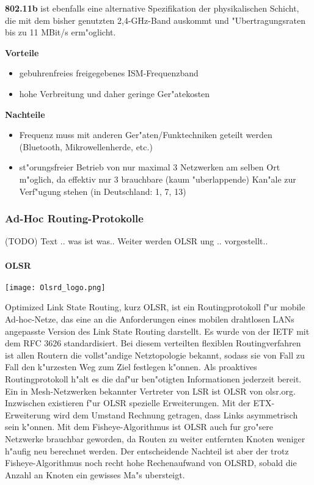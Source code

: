 \textbf{802.11b} ist ebenfalls eine alternative Spezifikation der physikalischen
Schicht, die mit dem bisher genutzten 2,4-GHz-Band auskommt und
"Ubertragungsraten bis zu 11 MBit/s erm"oglicht. 

\textbf{Vorteile}
\begin{itemize}	
	\item gebuhrenfreies freigegebenes ISM-Frequenzband 
	\item hohe Verbreitung und daher geringe Ger"atekosten 
\end{itemize}

\textbf{Nachteile}
\begin{itemize}	
	\item Frequenz muss mit anderen Ger"aten/Funktechniken geteilt werden
	(Bluetooth, Mikrowellenherde, etc.) 
	\item st"orungsfreier Betrieb von nur maximal 3 Netzwerken
	am selben Ort m"oglich, da effektiv nur 3 brauchbare
	(kaum "uberlappende) Kan"ale zur Verf"ugung stehen
	(in Deutschland: 1, 7, 13) 
\end{itemize}

\subsubsection{Ad-Hoc Routing-Protokolle}
(TODO) Text .. was ist was.. 
Weiter werden OLSR ung .. vorgestellt..

\paragraph{OLSR}

\texttt{[image: Olsrd\_logo.png]}

Optimized Link State Routing, kurz OLSR, ist ein Routingprotokoll
f"ur mobile Ad-hoc-Netze, das eine an die Anforderungen eines mobilen
drahtlosen LANs angepasste Version des Link State Routing darstellt. Es
wurde von der IETF mit dem RFC 3626 standardisiert. Bei diesem
verteilten flexiblen Routingverfahren ist allen Routern die vollst"andige
Netztopologie bekannt, sodass sie von Fall zu Fall den k"urzesten Weg zum
Ziel festlegen k"onnen. Als proaktives Routingprotokoll h"alt es die daf"ur
ben"otigten Informationen jederzeit bereit. Ein in Mesh-Netzwerken
bekannter Vertreter von LSR ist OLSR von olsr.org. Inzwischen existieren
f"ur OLSR spezielle Erweiterungen. Mit der ETX-Erweiterung wird dem
Umstand Rechnung getragen, dass Links asymmetrisch sein k"onnen. Mit
dem Fisheye-Algorithmus ist OLSR auch fur gro"sere Netzwerke brauchbar
geworden, da Routen zu weiter entfernten Knoten weniger h"aufig neu
berechnet werden. Der entscheidende Nachteil ist aber der trotz
Fisheye-Algorithmus noch recht hohe Rechenaufwand von OLSRD, sobald
die Anzahl an Knoten ein gewisses Ma"s ubersteigt.

